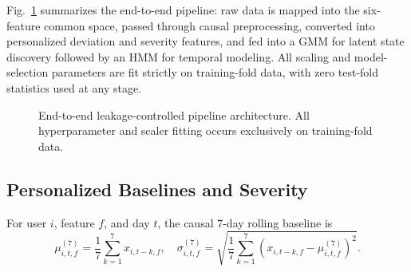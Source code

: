 \documentclass[conference]{IEEEtran}
\begin{document}
Fig.~\ref{fig:architecture} summarizes the end-to-end pipeline: raw data is mapped into the six-feature common space, passed through causal preprocessing, converted into personalized deviation and severity features, and fed into a GMM for latent state discovery followed by an HMM for temporal modeling. All scaling and model-selection parameters are fit strictly on training-fold data, with zero test-fold statistics used at any stage.

\begin{figure}[!htb]
\centering
{}
\caption{End-to-end leakage-controlled pipeline architecture. All hyperparameter and scaler fitting occurs exclusively on training-fold data.}
\label{fig:architecture}
\end{figure}

\subsection{Personalized Baselines and Severity}

For user $i$, feature $f$, and day $t$, the causal 7-day rolling baseline is
\begin{equation}
\mu_{i,t,f}^{(7)} = \frac{1}{7}\sum_{k=1}^{7} x_{i,t-k,f}, \quad
\sigma_{i,t,f}^{(7)} = \sqrt{\frac{1}{7}\sum_{k=1}^{7} (x_{i,t-k,f} - \mu_{i,t,f}^{(7)})^2}.
\end{equation}
\end{document}

